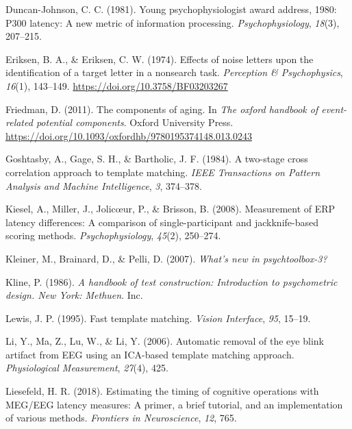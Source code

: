 \documentclass[
  man]{apa7}
\newlength{\cslhangindent}
\newlength{\cslentryspacingunit} %
\newenvironment{CSLReferences}[2] %
 {%
  \setlength{\parindent}{0pt}
  \ifodd #1
  \let\oldpar\par
  \def\par{\hangindent=\cslhangindent\oldpar}
  \fi
  \setlength{\parskip}{#2\cslentryspacingunit}
 }%
 {}
\begin{document}
\begin{CSLReferences}{1}{0}
\leavevmode{}%
Duncan-Johnson, C. C. (1981). Young psychophysiologist award address, 1980: {P300} latency: A new metric of information processing. \emph{Psychophysiology}, \emph{18}(3), 207--215.

\leavevmode{}%
Eriksen, B. A., \& Eriksen, C. W. (1974). Effects of noise letters upon the identification of a target letter in a nonsearch task. \emph{Perception \& Psychophysics}, \emph{16}(1), 143--149. \url{https://doi.org/10.3758/BF03203267}

\leavevmode{}%
Friedman, D. (2011). The components of aging. In \emph{The oxford handbook of event-related potential components}. Oxford University Press. \url{https://doi.org/10.1093/oxfordhb/9780195374148.013.0243}

\leavevmode{}%
Goshtasby, A., Gage, S. H., \& Bartholic, J. F. (1984). A two-stage cross correlation approach to template matching. \emph{IEEE Transactions on Pattern Analysis and Machine Intelligence}, \emph{3}, 374--378.

\leavevmode{}%
Kiesel, A., Miller, J., Jolicœur, P., \& Brisson, B. (2008). Measurement of {ERP} latency differences: {A} comparison of single-participant and jackknife-based scoring methods. \emph{Psychophysiology}, \emph{45}(2), 250--274.

\leavevmode{}%
Kleiner, M., Brainard, D., \& Pelli, D. (2007). \emph{What's new in psychtoolbox-3?}

\leavevmode{}%
Kline, P. (1986). \emph{A handbook of test construction: {Introduction} to psychometric design. {New} {York}: {Methuen}}. Inc.

\leavevmode{}%
Lewis, J. P. (1995). Fast template matching. \emph{Vision Interface}, \emph{95}, 15--19.

\leavevmode{}%
Li, Y., Ma, Z., Lu, W., \& Li, Y. (2006). Automatic removal of the eye blink artifact from {EEG} using an {ICA}-based template matching approach. \emph{Physiological Measurement}, \emph{27}(4), 425.

\leavevmode{}%
Liesefeld, H. R. (2018). Estimating the timing of cognitive operations with {MEG}/{EEG} latency measures: A primer, a brief tutorial, and an implementation of various methods. \emph{Frontiers in Neuroscience}, \emph{12}, 765.


\end{CSLReferences}
\end{document}
